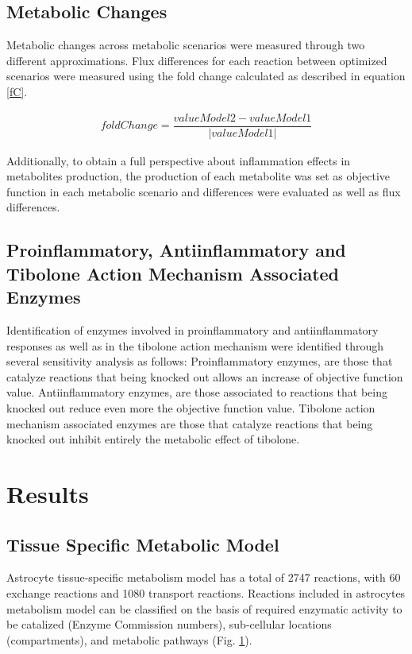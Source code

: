 \subsection*{Metabolic Changes}
Metabolic changes across metabolic scenarios were measured through two different approximations. Flux differences for each reaction between optimized scenarios were measured using the fold change calculated as described in equation \ref{fC}.
\begin{ceqn}
\begin{align}
\label{fC}
   foldChange = \dfrac{valueModel2-valueModel1}{\left|valueModel1\right|}
\end{align}
\end{ceqn}
Additionally, to obtain a full perspective about inflammation effects in metabolites production, the production of each metabolite was set as objective function in each metabolic scenario and differences were evaluated as well as flux differences.
\subsection*{Proinflammatory, Antiinflammatory and Tibolone Action Mechanism Associated Enzymes}
Identification of enzymes involved in proinflammatory and antiinflammatory responses as well as in the tibolone action mechanism were identified through several sensitivity analysis as follows: Proinflammatory enzymes, are those that catalyze reactions that being knocked out allows an increase of objective function value. Antiinflammatory enzymes, are those associated to reactions that being knocked out reduce even more the objective function value. Tibolone action mechanism associated enzymes are those that catalyze reactions that being knocked out inhibit entirely the metabolic effect of tibolone.
\section{Results}
\subsection*{Tissue Specific Metabolic Model}
Astrocyte tissue-specific metabolism model has a total of 2747 reactions, with 60 exchange reactions and 1080 transport reactions. Reactions included in astrocytes metabolism model can be classified on the basis of required enzymatic activity to be catalized (Enzyme Commission numbers), sub-cellular locations (compartments), and metabolic pathways (Fig. \ref{}). 

